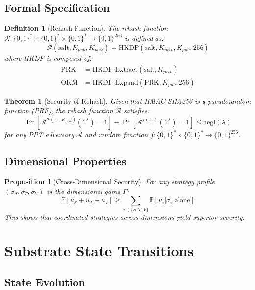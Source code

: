 \documentclass[11pt]{article}
\newtheorem{definition}{Definition}
\newtheorem{theorem}{Theorem}
\newtheorem{proposition}{Proposition}
\begin{document}
\subsection{Formal Specification}

\begin{definition}[Rehash Function]
The rehash function $\mathcal{R}: \{0,1\}^* \times \{0,1\}^* \times \{0,1\}^* \rightarrow \{0,1\}^{256}$ is defined as:
\[\mathcal{R}(\text{salt}, K_{pub}, K_{priv}) = \text{HKDF}(\text{salt}, K_{priv}, K_{pub}, 256)\]
where HKDF is composed of:
\begin{align}
\text{PRK} &= \text{HKDF-Extract}(\text{salt}, K_{priv})\\
\text{OKM} &= \text{HKDF-Expand}(\text{PRK}, K_{pub}, 256)
\end{align}
\end{definition}

\begin{theorem}[Security of Rehash]
Given that HMAC-SHA256 is a pseudorandom function (PRF), the rehash function $\mathcal{R}$ satisfies:
\[\Pr[\mathcal{A}^{\mathcal{R}(\cdot,\cdot,K_{priv})}(1^{\lambda}) = 1] - \Pr[\mathcal{A}^{f(\cdot,\cdot)}(1^{\lambda}) = 1] \leq \text{negl}(\lambda)\]
for any PPT adversary $\mathcal{A}$ and random function $f: \{0,1\}^* \times \{0,1\}^* \rightarrow \{0,1\}^{256}$.
\end{theorem}

\subsection{Dimensional Properties}

\begin{proposition}[Cross-Dimensional Security]
For any strategy profile $(\sigma_S, \sigma_T, \sigma_V)$ in the dimensional game $\Gamma$:
\[\mathbb{E}[u_S + u_T + u_V] \geq \sum_{i \in \{S,T,V\}} \mathbb{E}[u_i | \sigma_i \text{ alone}]\]
This shows that coordinated strategies across dimensions yield superior security.
\end{proposition}

\section{Substrate State Transitions}

\subsection{State Evolution}
\end{document}
